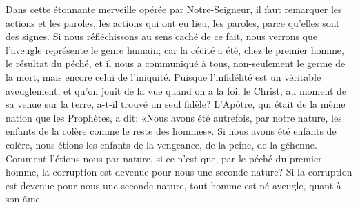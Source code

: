 Dans cette étonnante merveille opérée par Notre-Seigneur,
	il faut remarquer les actions et les paroles,
	les actions qui ont eu lieu,
	les paroles, parce qu’elles sont des signes.
Si nous réfléchissons au sens caché de ce fait,
	nous verrons que l’aveugle représente le genre humain;
	car la cécité a été, chez le premier homme, le résultat du péché,
	et il nous a communiqué à tous, non-seulement le germe de la mort,
	mais encore celui de l’iniquité.
Puisque l’infidélité est un véritable aveuglement,
	et qu’on jouit de la vue quand on a la foi,
	le Christ, au moment de sa venue sur la terre, a-t-il trouvé un seul fidèle? 
L’Apôtre, qui était de la même nation que les Prophètes,
	a dit: «Nous avons été autrefois, par notre nature,
	les enfants de la colère comme le reste des hommes».
Si nous avons été enfants de colère,
	nous étions les enfants de la vengeance, de la peine, de la géhenne.
Comment l’étions-nous par nature,
	si ce n’est que, par le péché du premier homme,
	la corruption est devenue pour nous une seconde nature?
Si la corruption est devenue pour nous une seconde nature,
	tout homme est né aveugle, quant à son âme.
